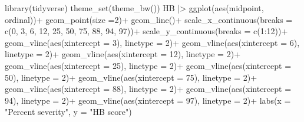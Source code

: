\documentclass[
  letterpaper,
  DIV=11,
  numbers=noendperiod]{scrreprt}
\newenvironment{Shaded}{\begin{snugshade}}{\end{snugshade}}
\newcommand{\AttributeTok}[1]{\textcolor[rgb]{0.40,0.45,0.13}{#1}}
\newcommand{\DecValTok}[1]{\textcolor[rgb]{0.68,0.00,0.00}{#1}}
\newcommand{\FunctionTok}[1]{\textcolor[rgb]{0.28,0.35,0.67}{#1}}
\newcommand{\NormalTok}[1]{\textcolor[rgb]{0.00,0.23,0.31}{#1}}
\newcommand{\SpecialCharTok}[1]{\textcolor[rgb]{0.37,0.37,0.37}{#1}}
\newcommand{\StringTok}[1]{\textcolor[rgb]{0.13,0.47,0.30}{#1}}
\begin{document}
\begin{Shaded}
\begin{Highlighting}[]
\FunctionTok{library}\NormalTok{(tidyverse)}
\FunctionTok{theme\_set}\NormalTok{(}\FunctionTok{theme\_bw}\NormalTok{())}
\NormalTok{HB }\SpecialCharTok{|\textgreater{}} 
  \FunctionTok{ggplot}\NormalTok{(}\FunctionTok{aes}\NormalTok{(midpoint, ordinal))}\SpecialCharTok{+}
  \FunctionTok{geom\_point}\NormalTok{(}\AttributeTok{size =}\DecValTok{2}\NormalTok{)}\SpecialCharTok{+}
  \FunctionTok{geom\_line}\NormalTok{()}\SpecialCharTok{+}
  \FunctionTok{scale\_x\_continuous}\NormalTok{(}\AttributeTok{breaks =} \FunctionTok{c}\NormalTok{(}\DecValTok{0}\NormalTok{, }\DecValTok{3}\NormalTok{, }\DecValTok{6}\NormalTok{, }\DecValTok{12}\NormalTok{, }\DecValTok{25}\NormalTok{, }\DecValTok{50}\NormalTok{, }\DecValTok{75}\NormalTok{, }\DecValTok{88}\NormalTok{, }\DecValTok{94}\NormalTok{, }\DecValTok{97}\NormalTok{))}\SpecialCharTok{+}
  \FunctionTok{scale\_y\_continuous}\NormalTok{(}\AttributeTok{breaks =} \FunctionTok{c}\NormalTok{(}\DecValTok{1}\SpecialCharTok{:}\DecValTok{12}\NormalTok{))}\SpecialCharTok{+}
  \FunctionTok{geom\_vline}\NormalTok{(}\FunctionTok{aes}\NormalTok{(}\AttributeTok{xintercept =} \DecValTok{3}\NormalTok{), }\AttributeTok{linetype =} \DecValTok{2}\NormalTok{)}\SpecialCharTok{+}
  \FunctionTok{geom\_vline}\NormalTok{(}\FunctionTok{aes}\NormalTok{(}\AttributeTok{xintercept =} \DecValTok{6}\NormalTok{), }\AttributeTok{linetype =} \DecValTok{2}\NormalTok{)}\SpecialCharTok{+}
  \FunctionTok{geom\_vline}\NormalTok{(}\FunctionTok{aes}\NormalTok{(}\AttributeTok{xintercept =} \DecValTok{12}\NormalTok{), }\AttributeTok{linetype =} \DecValTok{2}\NormalTok{)}\SpecialCharTok{+}
  \FunctionTok{geom\_vline}\NormalTok{(}\FunctionTok{aes}\NormalTok{(}\AttributeTok{xintercept =} \DecValTok{25}\NormalTok{), }\AttributeTok{linetype =} \DecValTok{2}\NormalTok{)}\SpecialCharTok{+}
  \FunctionTok{geom\_vline}\NormalTok{(}\FunctionTok{aes}\NormalTok{(}\AttributeTok{xintercept =} \DecValTok{50}\NormalTok{), }\AttributeTok{linetype =} \DecValTok{2}\NormalTok{)}\SpecialCharTok{+}
  \FunctionTok{geom\_vline}\NormalTok{(}\FunctionTok{aes}\NormalTok{(}\AttributeTok{xintercept =} \DecValTok{75}\NormalTok{), }\AttributeTok{linetype =} \DecValTok{2}\NormalTok{)}\SpecialCharTok{+}
  \FunctionTok{geom\_vline}\NormalTok{(}\FunctionTok{aes}\NormalTok{(}\AttributeTok{xintercept =} \DecValTok{88}\NormalTok{), }\AttributeTok{linetype =} \DecValTok{2}\NormalTok{)}\SpecialCharTok{+}
  \FunctionTok{geom\_vline}\NormalTok{(}\FunctionTok{aes}\NormalTok{(}\AttributeTok{xintercept =} \DecValTok{94}\NormalTok{), }\AttributeTok{linetype =} \DecValTok{2}\NormalTok{)}\SpecialCharTok{+}
  \FunctionTok{geom\_vline}\NormalTok{(}\FunctionTok{aes}\NormalTok{(}\AttributeTok{xintercept =} \DecValTok{97}\NormalTok{), }\AttributeTok{linetype =} \DecValTok{2}\NormalTok{)}\SpecialCharTok{+}
  \FunctionTok{labs}\NormalTok{(}\AttributeTok{x =} \StringTok{"Percent severity"}\NormalTok{, }\AttributeTok{y =} \StringTok{"HB score"}\NormalTok{)}
\end{Highlighting}
\end{Shaded}
\end{document}

